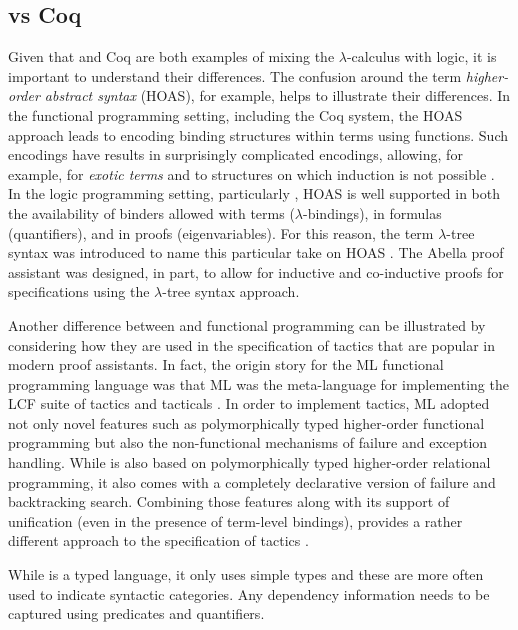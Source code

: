 \subsection{\lP vs Coq}

Given that \lP and Coq are both examples of mixing the
$\lambda$-calculus with logic, it is important to understand their
differences.  The confusion around the term \emph{higher-order
abstract syntax} (HOAS), for example, helps to illustrate their
differences.  In the functional programming setting, including the Coq
system, the HOAS approach leads to encoding binding structures within
terms using functions.  Such encodings have results in surprisingly
complicated encodings, allowing, for example, for \emph{exotic terms}
\cite{despeyroux95tlca} and to structures on which induction is not
possible \cite{roeckl01fossacs}.  In the logic programming setting,
particularly \lP, HOAS is well supported in both the availability of
binders allowed with terms ($\lambda$-bindings), in formulas
(quantifiers), and in proofs (eigenvariables).  For this reason, the
term $\lambda$-tree syntax was introduced to name this particular take
on HOAS \cite{miller19jar}.  The Abella proof assistant
\cite{baelde14jfr} was designed, in part, to allow for inductive and
co-inductive proofs for specifications using the $\lambda$-tree syntax
approach.

Another difference between \lP and functional programming can be
illustrated by considering how they are used in the specification of
tactics that are popular in modern proof assistants.  In fact, the
origin story for the ML functional programming language was that ML
was the meta-language for implementing the LCF suite of tactics and
tacticals \cite{gordon79}.  In order to implement tactics, ML adopted
not only novel features such as polymorphically typed higher-order
functional programming but also the non-functional mechanisms of
failure and exception handling.  While \lP is also based on
polymorphically typed higher-order relational programming, it also
comes with a completely declarative version of failure and
backtracking search.  Combining those features along with its support
of unification (even in the presence of term-level bindings), \lP
provides a rather different approach to the specification of tactics
\cite{felty93jar}.

While \lP is a typed language, it only uses simple types and these are
more often used to indicate syntactic categories.  Any dependency
information needs to be captured using predicates and quantifiers. 
